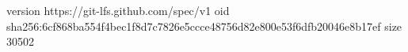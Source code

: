 version https://git-lfs.github.com/spec/v1
oid sha256:6cf868ba554f4bec1f8d7c7826e5ccce48756d82e800e53f6dfb20046e8b17ef
size 30502
